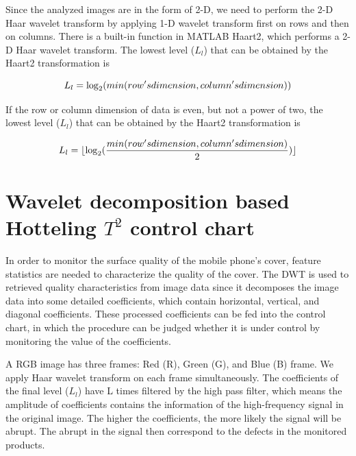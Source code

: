 Since the analyzed images are in the form of 2-D, we need to perform the 2-D Haar wavelet transform by applying 1-D wavelet transform first on rows and then on columns. There is a built-in function in MATLAB Haart2, which performs a 2-D Haar wavelet transform.
The lowest level ($L_l$) that can be obtained by the Haart2 transformation is


\begin{equation}
\centering L_l= \log_2(min(row's dimension,column's dimension)) \label{equa:log1}
\end{equation}

If the row or column dimension of data is even, but not a power of two, the lowest level ($L_l$) that can be obtained by the Haart2 transformation is

\begin{equation}
\centering L_l = \lfloor \log_2(\frac{min(row's dimension,column's dimension)}{2}) \rfloor \label{equa:log2}
\end{equation}








\section{Wavelet decomposition based Hotteling $T^{2}$ control chart}
In order to monitor the surface quality of the mobile phone's cover, feature statistics are needed to characterize the quality of the cover. The DWT is used to retrieved quality characteristics from image data since it decomposes the image data into some detailed coefficients, which contain horizontal, vertical, and diagonal coefficients. These processed coefficients can be fed into the control chart, in which the procedure can be judged whether it is under control by monitoring the value of the coefficients.


A RGB image has three frames: Red (R), Green (G), and Blue (B) frame. We apply Haar wavelet transform on each frame simultaneously. The coefficients of the final level ($L_l$) have L times filtered by the high pass filter, which means the amplitude of coefficients contains the information of the high-frequency signal in the original image. The higher the coefficients, the more likely the signal will be abrupt. The abrupt in the signal then correspond to the defects in the monitored products.


